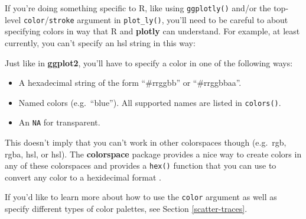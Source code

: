 \documentclass[
  12pt,
]{krantz}
\newenvironment{Shaded}{\begin{snugshade}}{\end{snugshade}}
\newcommand{\CommentTok}[1]{\textcolor[rgb]{0.56,0.35,0.01}{\textit{#1}}}
\newcommand{\DataTypeTok}[1]{\textcolor[rgb]{0.13,0.29,0.53}{#1}}
\newcommand{\DecValTok}[1]{\textcolor[rgb]{0.00,0.00,0.81}{#1}}
\newcommand{\FloatTok}[1]{\textcolor[rgb]{0.00,0.00,0.81}{#1}}
\newcommand{\KeywordTok}[1]{\textcolor[rgb]{0.13,0.29,0.53}{\textbf{#1}}}
\newcommand{\NormalTok}[1]{#1}
\newcommand{\OperatorTok}[1]{\textcolor[rgb]{0.81,0.36,0.00}{\textbf{#1}}}
\newcommand{\StringTok}[1]{\textcolor[rgb]{0.31,0.60,0.02}{#1}}
\providecommand{\tightlist}{%
  \setlength{\itemsep}{0pt}\setlength{\parskip}{0pt}}
\begin{document}
If you're doing something specific to R, like using \texttt{ggplotly()} and/or the top-level \texttt{color}/\texttt{stroke} argument in \texttt{plot\_ly()}, you'll need to be careful to about specifying colors in way that R and \textbf{plotly} can understand. For example, at least currently, you can't specify an hsl string in this way:

\begin{Shaded}
\end{Shaded}

Just like in \textbf{ggplot2}, you'll have to specify a color in one of the following ways:

\begin{itemize}
\tightlist
\item
  A hexadecimal string of the form ``\#rrggbb'' or ``\#rrggbbaa''.
\item
  Named colors (e.g.~``blue''). All supported names are listed in \texttt{colors()}.
\item
  An \texttt{NA} for transparent.
\end{itemize}

This doesn't imply that you can't work in other colorspaces though (e.g.~rgb, rgba, hsl, or hsl). The \textbf{colorspace} package provides a nice way to create colors in any of these colorspaces and provides a \texttt{hex()} function that you can use to convert any color to a hexidecimal format \citep{colorspace}.

\begin{Shaded}
\end{Shaded}

If you'd like to learn more about how to use the \texttt{color} argument as well as specify different types of color palettes, see Section \ref{scatter-traces}.
\end{document}
